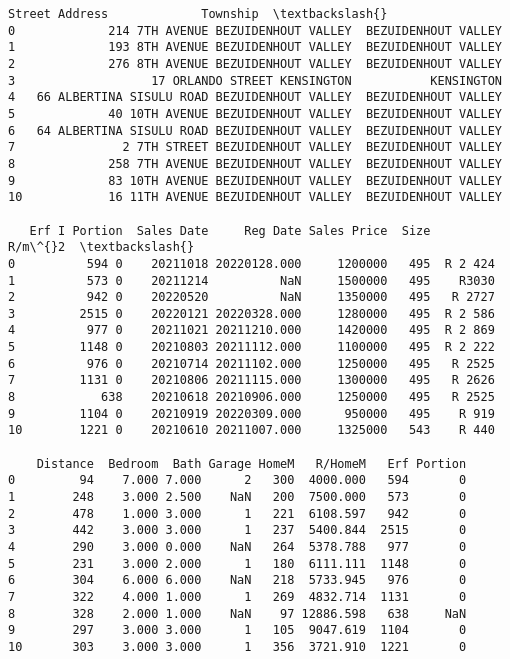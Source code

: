             \begin{tcolorbox}[breakable, size=fbox, boxrule=.5pt, pad at break*=1mm, opacityfill=0]
\begin{Verbatim}[commandchars=\\\{\}]
                                  Street Address             Township  \textbackslash{}
0             214 7TH AVENUE BEZUIDENHOUT VALLEY  BEZUIDENHOUT VALLEY
1             193 8TH AVENUE BEZUIDENHOUT VALLEY  BEZUIDENHOUT VALLEY
2             276 8TH AVENUE BEZUIDENHOUT VALLEY  BEZUIDENHOUT VALLEY
3                   17 ORLANDO STREET KENSINGTON           KENSINGTON
4   66 ALBERTINA SISULU ROAD BEZUIDENHOUT VALLEY  BEZUIDENHOUT VALLEY
5             40 10TH AVENUE BEZUIDENHOUT VALLEY  BEZUIDENHOUT VALLEY
6   64 ALBERTINA SISULU ROAD BEZUIDENHOUT VALLEY  BEZUIDENHOUT VALLEY
7               2 7TH STREET BEZUIDENHOUT VALLEY  BEZUIDENHOUT VALLEY
8             258 7TH AVENUE BEZUIDENHOUT VALLEY  BEZUIDENHOUT VALLEY
9             83 10TH AVENUE BEZUIDENHOUT VALLEY  BEZUIDENHOUT VALLEY
10            16 11TH AVENUE BEZUIDENHOUT VALLEY  BEZUIDENHOUT VALLEY

   Erf I Portion  Sales Date     Reg Date Sales Price  Size    R/m\^{}2  \textbackslash{}
0          594 0    20211018 20220128.000     1200000   495  R 2 424
1          573 0    20211214          NaN     1500000   495    R3030
2          942 0    20220520          NaN     1350000   495   R 2727
3         2515 0    20220121 20220328.000     1280000   495  R 2 586
4          977 0    20211021 20211210.000     1420000   495  R 2 869
5         1148 0    20210803 20211112.000     1100000   495  R 2 222
6          976 0    20210714 20211102.000     1250000   495   R 2525
7         1131 0    20210806 20211115.000     1300000   495   R 2626
8            638    20210618 20210906.000     1250000   495   R 2525
9         1104 0    20210919 20220309.000      950000   495    R 919
10        1221 0    20210610 20211007.000     1325000   543    R 440

    Distance  Bedroom  Bath Garage HomeM   R/HomeM   Erf Portion
0         94    7.000 7.000      2   300  4000.000   594       0
1        248    3.000 2.500    NaN   200  7500.000   573       0
2        478    1.000 3.000      1   221  6108.597   942       0
3        442    3.000 3.000      1   237  5400.844  2515       0
4        290    3.000 0.000    NaN   264  5378.788   977       0
5        231    3.000 2.000      1   180  6111.111  1148       0
6        304    6.000 6.000    NaN   218  5733.945   976       0
7        322    4.000 1.000      1   269  4832.714  1131       0
8        328    2.000 1.000    NaN    97 12886.598   638     NaN
9        297    3.000 3.000      1   105  9047.619  1104       0
10       303    3.000 3.000      1   356  3721.910  1221       0
\end{Verbatim}
\end{tcolorbox}
        

